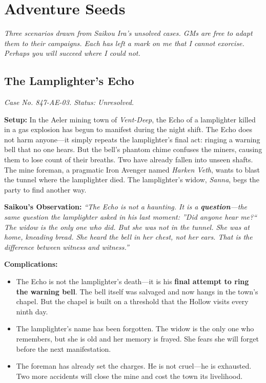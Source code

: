 \section{Adventure Seeds}

\emph{Three scenarios drawn from Saikou Ira's unsolved cases. GMs are free to adapt them to their campaigns. Each has left a mark on me that I cannot exorcise. Perhaps you will succeed where I could not.}

\subsection{The Lamplighter's Echo}

\emph{Case No. 847-AE-03. Status: Unresolved.}

\textbf{Setup:} In the Aeler mining town of \emph{Vent-Deep}, the Echo of a lamplighter killed in a gas explosion has begun to manifest during the night shift. The Echo does not harm anyone---it simply repeats the lamplighter's final act: ringing a warning bell that no one hears. But the bell's phantom chime confuses the miners, causing them to lose count of their breaths. Two have already fallen into unseen shafts. The mine foreman, a pragmatic Iron Avenger named \emph{Harken Veth}, wants to blast the tunnel where the lamplighter died. The lamplighter's widow, \emph{Sanna}, begs the party to find another way.

\textbf{Saikou's Observation:} \emph{``The Echo is not a haunting. It is a \textbf{question}---the same question the lamplighter asked in his last moment: ''Did anyone hear me?`` The widow is the only one who did. But she was not in the tunnel. She was at home, kneading bread. She heard the bell in her chest, not her ears. That is the difference between witness and witness.''}

\textbf{Complications:}
\begin{itemize}
  \item The Echo is not the lamplighter's death---it is his \textbf{final attempt to ring the warning bell}. The bell itself was salvaged and now hangs in the town's chapel. But the chapel is built on a threshold that the Hollow visits every ninth day.
  \item The lamplighter's name has been forgotten. The widow is the only one who remembers, but she is old and her memory is frayed. She fears she will forget before the next manifestation.
  \item The foreman has already set the charges. He is not cruel---he is exhausted. Two more accidents will close the mine and cost the town its livelihood.
\end{itemize}

